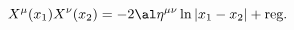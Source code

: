 \begin{equation}
X^\mu(x_1)X^\nu(x_2)= -2\al \eta^{\mu\nu}\ln |x_1-x_2| +\mbox{reg}.
\label{BOPE}
\end{equation}

